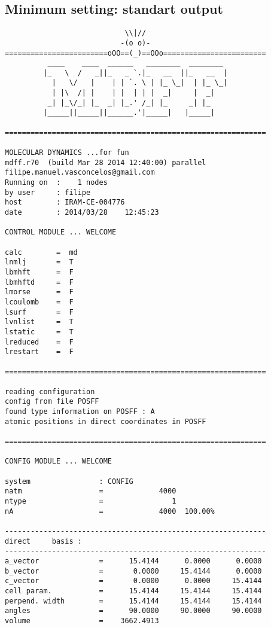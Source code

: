 \documentclass[a4paper]{article}
\begin{document}
\subsection{Minimum setting: standart output}
\begin{verbatim}
                            \\|//                            
                           -(o o)-                           
========================oOO==(_)==OOo========================
          ____    ____  ______   ________  ________  
         |_   \  /   _||_   _ `.|_   __  ||_   __  | 
           |   \/   |    | | `. \ | |_ \_|  | |_ \_| 
           | |\  /| |    | |  | | |  _|     |  _|    
          _| |_\/_| |_  _| |_.' /_| |_     _| |_     
         |_____||_____||______.'|_____|   |_____|    

=============================================================

MOLECULAR DYNAMICS ...for fun                 
mdff.r70  (build Mar 28 2014 12:40:00) parallel                                 
filipe.manuel.vasconcelos@gmail.com  
Running on  :    1 nodes                  
by user     : filipe                        
host        : IRAM-CE-004776
date        : 2014/03/28    12:45:23

CONTROL MODULE ... WELCOME

calc        =  md                                                          
lnmlj       =  T
lbmhft      =  F
lbmhftd     =  F
lmorse      =  F
lcoulomb    =  F
lsurf       =  F
lvnlist     =  T
lstatic     =  T
lreduced    =  F
lrestart    =  F

=============================================================

reading configuration
config from file POSFF
found type information on POSFF : A  
atomic positions in direct coordinates in POSFF

=============================================================

CONFIG MODULE ... WELCOME

system                : CONFIG                                                      
natm                  =             4000
ntype                 =                1
nA                    =             4000  100.00%

-------------------------------------------------------------
direct     basis : 
-------------------------------------------------------------
a_vector              =      15.4144      0.0000      0.0000
b_vector              =       0.0000     15.4144      0.0000
c_vector              =       0.0000      0.0000     15.4144
cell param.           =      15.4144     15.4144     15.4144
perpend. width        =      15.4144     15.4144     15.4144
angles                =      90.0000     90.0000     90.0000
volume                =    3662.4913



\end{verbatim}
\end{document}
